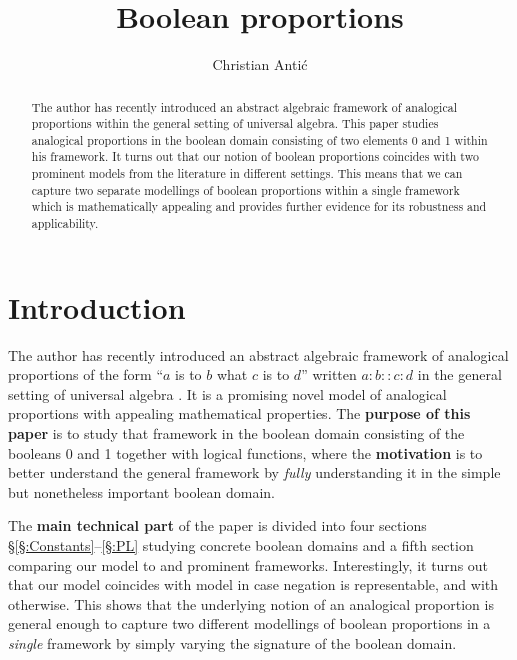 \documentclass[11pt]{amsart}
\title{
	Boolean proportions
}
\author{
	Christian Anti\'c
}
\theoremstyle{definition} %
\begin{document}
\begin{abstract}
	The author has recently introduced an abstract algebraic framework of analogical proportions within the general setting of universal algebra. This paper studies analogical proportions in the boolean domain consisting of two elements 0 and 1 within his framework. It turns out that our notion of boolean proportions coincides with two prominent models from the literature in different settings. This means that we can capture two separate modellings of boolean proportions within a single framework which is mathematically appealing and provides further evidence for its robustness and applicability.
\end{abstract}

\maketitle

\section{Introduction}

The author has recently introduced an abstract algebraic framework of analogical proportions of the form ``$a$ is to $b$ what $c$ is to $d$'' written $a:b::c:d$ in the general setting of universal algebra \cite{Antic22}. It is a promising novel model of analogical proportions with appealing mathematical properties. The \textbf{purpose of this paper} is to study that framework in the boolean domain consisting of the booleans 0 and 1 together with logical functions, where the \textbf{motivation} is to better understand the general framework by \textit{fully} understanding it in the simple but nonetheless important boolean domain. %

The \textbf{main technical part} of the paper is divided into four sections §\ref{§:Constants}--\ref{§:PL} studying concrete boolean domains and a fifth section  comparing our model to  and  prominent frameworks. Interestingly, it turns out that our model coincides with  model in case negation is representable, and with  otherwise. This shows that the underlying notion of an analogical proportion is general enough to capture two different modellings of boolean proportions in a \textit{single} framework by simply varying the signature of the boolean domain.
\end{document}
